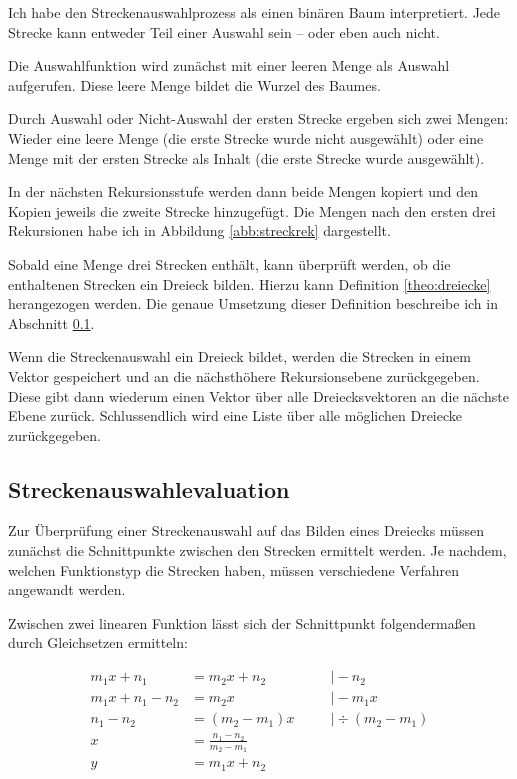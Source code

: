 Ich habe den Streckenauswahlprozess als einen binären Baum interpretiert. Jede Strecke kann entweder Teil einer Auswahl sein -- oder eben auch nicht.

Die Auswahlfunktion wird zunächst mit einer leeren Menge als Auswahl aufgerufen.
Diese leere Menge bildet die Wurzel des Baumes.

Durch Auswahl oder Nicht-Auswahl der ersten Strecke ergeben sich zwei Mengen: Wieder eine
leere Menge (die erste Strecke wurde nicht ausgewählt) oder eine Menge mit der ersten
Strecke als Inhalt (die erste Strecke wurde ausgewählt).

In der nächsten Rekursionsstufe werden dann beide Mengen kopiert und den Kopien jeweils
die zweite Strecke hinzugefügt. Die Mengen nach den ersten drei Rekursionen habe ich
in Abbildung \ref{abb:streckrek} dargestellt.

Sobald eine Menge drei Strecken enthält, kann überprüft werden, ob die enthaltenen
Strecken ein Dreieck bilden.
Hierzu kann Definition \ref{theo:dreiecke} herangezogen werden.
Die genaue Umsetzung dieser Definition beschreibe ich in Abschnitt \ref{sec:eval}.

Wenn die Streckenauswahl ein Dreieck bildet, werden die Strecken in einem Vektor
gespeichert und an die nächsthöhere Rekursionsebene zurückgegeben.
Diese gibt dann wiederum einen Vektor über alle Dreiecksvektoren an die nächste Ebene
zurück.
Schlussendlich wird eine Liste über alle möglichen Dreiecke zurückgegeben.

\subsection{Streckenauswahlevaluation}
\label{sec:eval}
Zur Überprüfung einer Streckenauswahl auf das Bilden eines Dreiecks
müssen zunächst die Schnittpunkte zwischen den Strecken ermittelt werden.
Je nachdem, welchen Funktionstyp die Strecken haben,
müssen verschiedene Verfahren angewandt werden.

Zwischen zwei linearen Funktion lässt sich der Schnittpunkt folgendermaßen durch
Gleichsetzen ermitteln:

\begin{equation}
    \begin{aligned}
        m_1x+n_1 &= m_2x+n_2             &&\quad\vert -n_2          \\
        m_1x+n_1-n_2 &= m_2x             &&\quad\vert -m_1x         \\
        n_1-n_2 &= (m_2-m_1)x            &&\quad\vert \div(m_2-m_1) \\
        x &= \frac{n_1-n_2}{m_2-m_1}                                \\
        y &= m_1x+n_2                                               \\
    \end{aligned}
    \label{eq:linearschnitt}
\end{equation}

